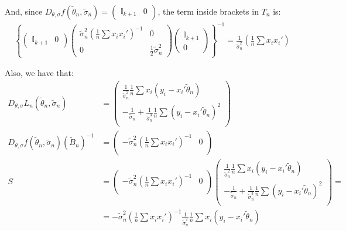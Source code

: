 \documentclass[12pt]{paper}
\begin{document}
And, since $D_{\theta,\sigma}f(\tilde{\theta}_n,\tilde{\sigma}_n)=\begin{pmatrix}
\mathbb{I}_{k+1}&0
\end{pmatrix}$, the term inside brackets in $T_n$ is:
\begin{align*}
\left\{\begin{pmatrix}
\mathbb{I}_{k+1}&0
\end{pmatrix}
\begin{pmatrix}
\tilde{\sigma}_n^2\left(\frac{1}{n}\sum{x_ix_i'}\right)^{-1} & 0\\
0 & \frac{1}{2}\tilde{\sigma}_n^2
\end{pmatrix}
\begin{pmatrix}
\mathbb{I}_{k+1}\\
0
\end{pmatrix}\right\}^{-1}=\frac{1}{\tilde{\sigma}_n^2}\left(\frac{1}{n}\sum{x_ix_i'}\right)
\end{align*}

Also, we have that:
\begin{align*}
D_{\theta,\sigma} L_n(\tilde{\theta}_n,\tilde{\sigma}_n)&=\begin{pmatrix}
\frac{1}{\tilde{\sigma}_n^2}\frac{1}{n}\sum{x_i(y_i-x_i'\tilde{\theta}_n)}\\
-\frac{1}{\tilde{\sigma}_n}+\frac{1}{\tilde{\sigma}_n^3}\frac{1}{n}\sum{(y_i-x_i'\tilde{\theta}_n)^2}\\
\end{pmatrix}\\
D_{\theta,\sigma}f(\tilde{\theta}_n,\tilde{\sigma}_n)(\tilde{B}_n)^{-1}&=\begin{pmatrix}
-\tilde{\sigma}_n^2\left(\frac{1}{n}\sum{x_ix_i'}\right)^{-1} & 0\\
\end{pmatrix}\\
S&=\begin{pmatrix}
-\tilde{\sigma}_n^2\left(\frac{1}{n}\sum{x_ix_i'}\right)^{-1} & 0\\
\end{pmatrix}
\begin{pmatrix}
\frac{1}{\tilde{\sigma}_n^2}\frac{1}{n}\sum{x_i(y_i-x_i'\tilde{\theta}_n)}\\
-\frac{1}{\tilde{\sigma}_n}+\frac{1}{\tilde{\sigma}_n^3}\frac{1}{n}\sum{(y_i-x_i'\tilde{\theta}_n)^2}\\
\end{pmatrix}=\\
&=-\tilde{\sigma}_n^2\left(\frac{1}{n}\sum{x_ix_i'}\right)^{-1}\frac{1}{\tilde{\sigma}_n^2}\frac{1}{n}\sum{x_i(y_i-x_i'\tilde{\theta}_n)}\\
\end{align*}
\end{document}
